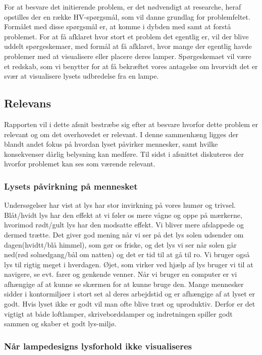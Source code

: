 For at besvare det initierende problem, er det nødvendigt at researche, heraf opstilles der en række HV-spørgsmål, som vil danne grundlag for problemfeltet. Formålet med disse spørgsmål er, at komme i dybden med samt at forstå problemet.  
For at få afklaret hvor stort et problem det egentlig er, vil der blive uddelt spørgeskemaer, med formål at få afklaret, hvor mange der egentlig havde problemer med at visualisere eller placere deres lamper. 
Spørgeskemaet vil være et redskab, som vi benytter for at få bekræftet vores antagelse om hvorvidt det er svær at visualisere lysets udbredelse fra en lampe. 

\subsection{Relevans}
Rapporten vil i dette afsnit bestræbe sig efter at besvare hvorfor dette problem er relevant og om det overhovedet er relevant. I denne sammenhæng ligges der blandt andet fokus på hvordan lyset påvirker mennesker, samt hvilke konsekvenser dårlig belysning kan medføre. Til sidst i afsnittet diskuteres der hvorfor problemet kan ses som værende relevant.

\subsubsection{Lysets påvirkning på mennesket}

Undersøgelser har vist at lys har stor invirkning på vores humør og trivsel.
Blåt/hvidt lys har den effekt at vi føler os mere vågne og oppe på mærkerne\cite{videnskab_dk_paavirkning}, hvorimod rødt/gult lys har den modsatte effekt. Vi bliver mere afslappede og dermed trætte. Det giver god mening når vi ser på det lys solen udsender om dagen(hvidtt/blå himmel), som gør os friske, og det lys vi ser når solen går ned(rød solnedgang/bål om natten) og det er tid til at gå til ro. Vi bruger også lys til rigtig meget i hverdagen. Øjet, som virker ved hjælp af lys bruger vi til at navigere, se evt. farer og genkende venner. Når vi bruger en computer er vi afhængige af at kunne se skærmen for at kunne bruge den. Mange mennesker sidder i kontormiljøer i stort set al deres arbejdstid og er afhængige af at lyset er godt. Hvis lyset ikke er godt vil man ofte blive træt og uproduktiv. Derfor er det vigtigt at både loftlamper, skrivebordslamper og indretningen spiller godt sammen og skaber et godt lys-miljø.


\subsubsection{Når lampedesigns lysforhold ikke visualiseres}

